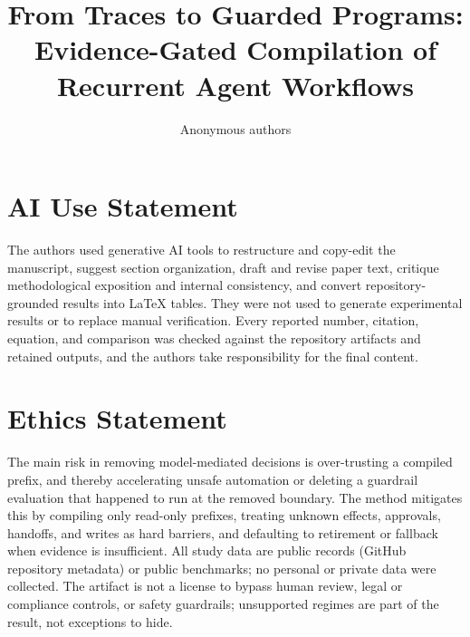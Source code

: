 \documentclass{article}
\title{From Traces to Guarded Programs: Evidence-Gated Compilation of Recurrent Agent Workflows}
\author{Anonymous authors}
\theoremstyle{plain}
\theoremstyle{definition}
\begin{document}
\maketitle

\begin{abstract}

\end{abstract}










\section*{AI Use Statement}
The authors used generative AI tools to restructure and copy-edit the
manuscript, suggest section organization, draft and revise paper text, critique
methodological exposition and internal consistency, and convert
repository-grounded results into LaTeX tables. They were not used to generate
experimental results or to replace manual verification. Every reported number,
citation, equation, and comparison was checked against the repository artifacts
and retained outputs, and the authors take responsibility for the final content.

\section*{Ethics Statement}
The main risk in removing model-mediated decisions is over-trusting a compiled
prefix, and thereby accelerating unsafe automation or deleting a guardrail
evaluation that happened to run at the removed boundary. The method mitigates
this by compiling only read-only prefixes, treating unknown effects, approvals,
handoffs, and writes as hard barriers, and defaulting to retirement or fallback
when evidence is insufficient. All study data are public records (GitHub
repository metadata) or public benchmarks; no personal or private data were
collected. The artifact is not a license to bypass human review, legal or
compliance controls, or safety guardrails; unsupported regimes are part of the
result, not exceptions to hide.
\end{document}
